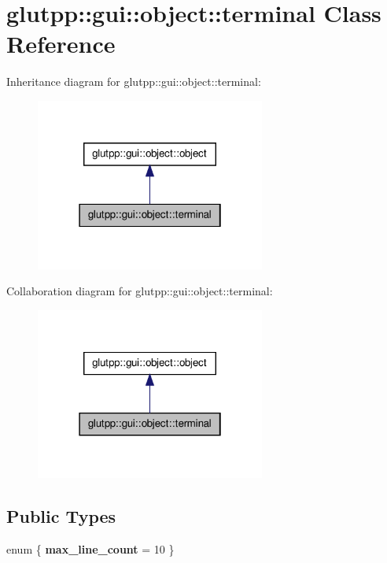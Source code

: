 \hypertarget{classglutpp_1_1gui_1_1object_1_1terminal}{\section{glutpp\-:\-:gui\-:\-:object\-:\-:terminal \-Class \-Reference}
\label{classglutpp_1_1gui_1_1object_1_1terminal}
}


\-Inheritance diagram for glutpp\-:\-:gui\-:\-:object\-:\-:terminal\-:
\nopagebreak
\begin{figure}[H]
\begin{center}
\leavevmode
\includegraphics[width=214pt]{classglutpp_1_1gui_1_1object_1_1terminal__inherit__graph}
\end{center}
\end{figure}


\-Collaboration diagram for glutpp\-:\-:gui\-:\-:object\-:\-:terminal\-:
\nopagebreak
\begin{figure}[H]
\begin{center}
\leavevmode
\includegraphics[width=214pt]{classglutpp_1_1gui_1_1object_1_1terminal__coll__graph}
\end{center}
\end{figure}
\subsection*{\-Public \-Types}
\begin{DoxyCompactItemize}
\item 
enum \{ {\bfseries max\-\_\-line\-\_\-count} =  10
 \}
\end{DoxyCompactItemize}
